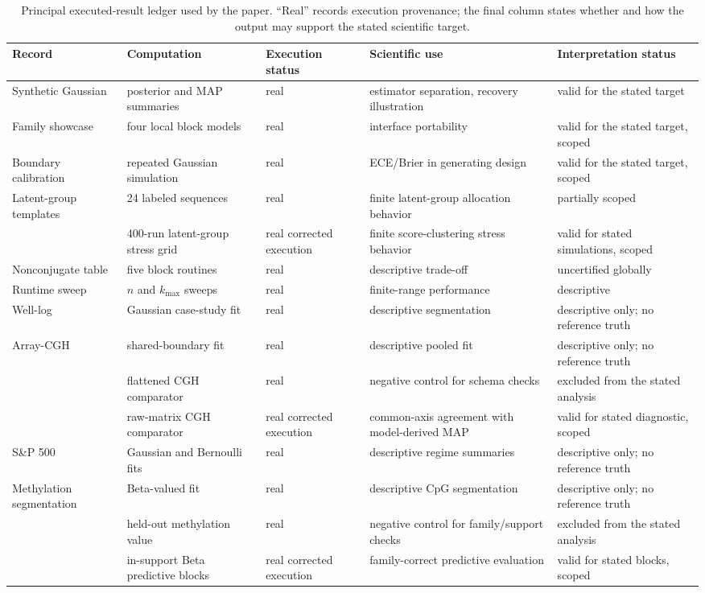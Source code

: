 \begin{table}[H]
\centering
\scriptsize
\caption{Principal executed-result ledger used by the paper. ``Real'' records execution provenance; the final column states whether and how the output may support the stated scientific target.}
\label{tab:result-ledger-app}
\begin{tabularx}{0.98\textwidth}{@{}L{0.18\textwidth}L{0.19\textwidth}L{0.15\textwidth}Y L{0.16\textwidth}@{}}
\toprule
Record & Computation & Execution status & Scientific use & Interpretation status \\
\midrule
Synthetic Gaussian & posterior and MAP summaries & real & estimator separation, recovery illustration & valid for the stated target \\
Family showcase & four local block models & real & interface portability & valid for the stated target, scoped \\
Boundary calibration & repeated Gaussian simulation & real & ECE/Brier in generating design & valid for the stated target, scoped \\
Latent-group templates & 24 labeled sequences & real & finite latent-group allocation behavior & partially scoped \\
 & 400-run latent-group stress grid & real corrected execution & finite score-clustering stress behavior & valid for stated simulations, scoped \\
Nonconjugate table & five block routines & real & descriptive trade-off & uncertified globally \\
Runtime sweep & $n$ and $k_{\max}$ sweeps & real & finite-range performance & descriptive \\
Well-log & Gaussian case-study fit & real & descriptive segmentation & descriptive only; no reference truth \\
Array-CGH & shared-boundary fit & real & descriptive pooled fit & descriptive only; no reference truth \\
 & flattened CGH comparator & real & negative control for schema checks & excluded from the stated analysis \\
 & raw-matrix CGH comparator & real corrected execution & common-axis agreement with model-derived MAP & valid for stated diagnostic, scoped \\
S\&P 500 & Gaussian and Bernoulli fits & real & descriptive regime summaries & descriptive only; no reference truth \\
Methylation segmentation & Beta-valued fit & real & descriptive CpG segmentation & descriptive only; no reference truth \\
 & held-out methylation value & real & negative control for family/support checks & excluded from the stated analysis \\
 & in-support Beta predictive blocks & real corrected execution & family-correct predictive evaluation & valid for stated blocks, scoped \\
\bottomrule
\end{tabularx}
\end{table}

